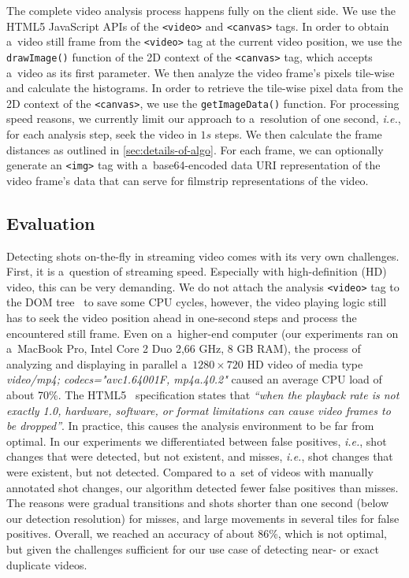 The complete video analysis process happens fully
on the client side.
We use the HTML5 JavaScript APIs of the \texttt{<video>} and
\texttt{<canvas>} tags.
In order to obtain a~video still frame
from the \texttt{<video>} tag at the current video position,
we use the \texttt{drawImage()} function of the 2D context of the
\texttt{<canvas>} tag,
which accepts a~video as its first parameter.
We then analyze the video frame's pixels tile-wise
and calculate the histograms.
In order to retrieve the tile-wise pixel data
from the 2D context of the \texttt{<canvas>},
we use the \texttt{getImageData()} function.
For processing speed reasons, we currently limit our approach to
a~resolution of one second, \emph{i.e.},
for each analysis step,
seek the video in $\mathit{1s}$ steps.
We then calculate the frame distances as outlined in
\autoref{sec:details-of-algo}.
For each frame, we can optionally generate an \texttt{<img>} tag
with a~base64-encoded data URI representation
of the video frame's data
that can serve for filmstrip representations of the video.

\subsection{Evaluation} \label{sec:evaluation}

Detecting shots on-the-fly in streaming video
comes with its very own challenges.
First, it is a~question of streaming speed.
Especially with high-definition (HD) video,
this can be very demanding.
We do not attach the analysis \texttt{<video>} tag
to the DOM tree~\cite{lehors2004dom} to save some CPU cycles,
however, the video playing logic still has to seek the video position
ahead in one-second steps  and process the encountered still frame.
Even on a~higher-end computer (our experiments ran on a~MacBook
Pro, Intel Core 2 Duo 2,66 GHz, 8 GB RAM),
the process of analyzing and displaying in parallel
a~$\mathit{1280} \times \mathit{720}$ HD video of media type
\emph{video/mp4; codecs="avc1.64001F, mp4a.40.2"}
caused an average CPU load of about 70\%.
The HTML5~\cite{berjon2012html5} specification states that
\textit{``when the playback rate is not exactly 1.0,
hardware, software, or format limitations can cause video frames
to be dropped''}.
In practice, this causes the analysis environment
to be far from optimal.
In our experiments we differentiated between false positives,
\emph{i.e.}, shot changes that were detected,
but not existent, and misses, \emph{i.e.},
shot changes that were existent,
but not detected.
Compared to a~set of videos with manually annotated shot changes,
our algorithm detected fewer false positives than misses.
The reasons were gradual transitions and shots
shorter than one second (below our detection resolution)
for misses, and large movements in several tiles
for false positives.
Overall, we reached an accuracy of about 86\%,
which is not optimal, but given the challenges
sufficient for our use case of
detecting near- or exact duplicate videos. 

